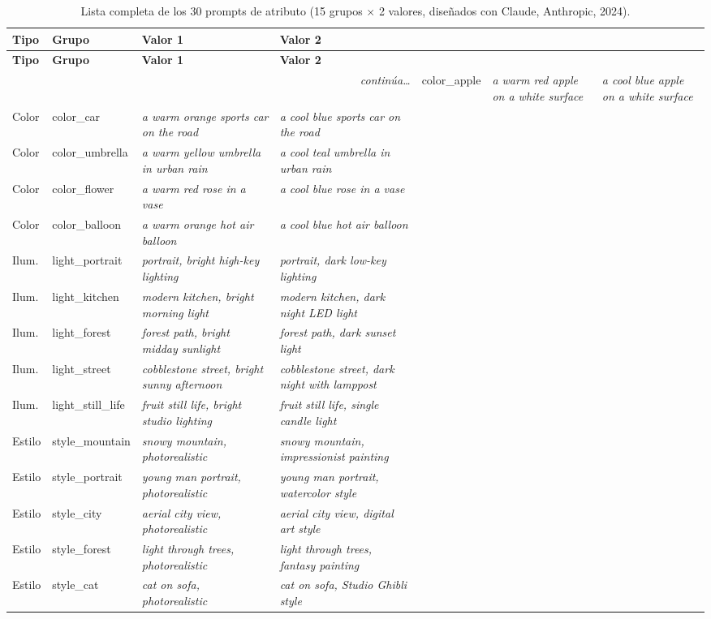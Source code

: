 \documentclass[12pt, a4paper, twoside]{book}
\begin{document}
\begin{longtable}{llp{4.4cm}p{4.4cm}}
\caption{Lista completa de los 30 prompts de atributo (15 grupos $\times$ 2 valores, diseñados con Claude, Anthropic, 2024).}
\label{tab:prompts_atributo} \\
\toprule
\textbf{Tipo} & \textbf{Grupo} & \textbf{Valor 1} & \textbf{Valor 2} \\
\midrule
\endfirsthead
\toprule \textbf{Tipo} & \textbf{Grupo} & \textbf{Valor 1} & \textbf{Valor 2} \\ \midrule
\endhead
\midrule \multicolumn{4}{r}{\small\textit{continúa\ldots}} \endfoot
\bottomrule \endlastfoot
Color & color\_apple & \textit{a warm red apple on a white surface} & \textit{a cool blue apple on a white surface} \\
Color & color\_car & \textit{a warm orange sports car on the road} & \textit{a cool blue sports car on the road} \\
Color & color\_umbrella & \textit{a warm yellow umbrella in urban rain} & \textit{a cool teal umbrella in urban rain} \\
Color & color\_flower & \textit{a warm red rose in a vase} & \textit{a cool blue rose in a vase} \\
Color & color\_balloon & \textit{a warm orange hot air balloon} & \textit{a cool blue hot air balloon} \\
Ilum. & light\_portrait & \textit{portrait, bright high-key lighting} & \textit{portrait, dark low-key lighting} \\
Ilum. & light\_kitchen & \textit{modern kitchen, bright morning light} & \textit{modern kitchen, dark night LED light} \\
Ilum. & light\_forest & \textit{forest path, bright midday sunlight} & \textit{forest path, dark sunset light} \\
Ilum. & light\_street & \textit{cobblestone street, bright sunny afternoon} & \textit{cobblestone street, dark night with lamppost} \\
Ilum. & light\_still\_life & \textit{fruit still life, bright studio lighting} & \textit{fruit still life, single candle light} \\
Estilo & style\_mountain & \textit{snowy mountain, photorealistic} & \textit{snowy mountain, impressionist painting} \\
Estilo & style\_portrait & \textit{young man portrait, photorealistic} & \textit{young man portrait, watercolor style} \\
Estilo & style\_city & \textit{aerial city view, photorealistic} & \textit{aerial city view, digital art style} \\
Estilo & style\_forest & \textit{light through trees, photorealistic} & \textit{light through trees, fantasy painting} \\
Estilo & style\_cat & \textit{cat on sofa, photorealistic} & \textit{cat on sofa, Studio Ghibli style} \\
\end{longtable}
\end{document}
